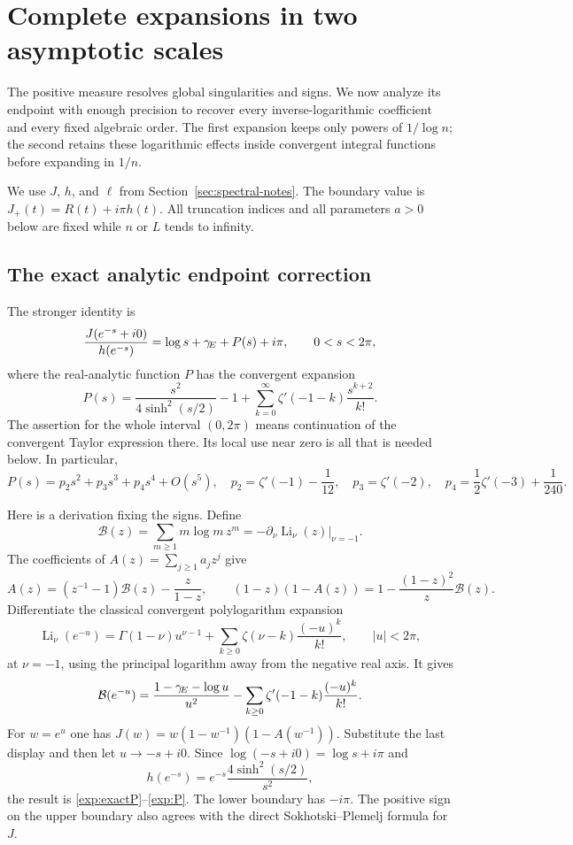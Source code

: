 \section{Complete expansions in two asymptotic scales}
\label{sec:expansions}

The positive measure resolves global singularities and signs. We now analyze
its endpoint with enough precision to recover every inverse-logarithmic
coefficient and every fixed algebraic order. The first expansion keeps only
powers of $1/\log n$; the second retains these logarithmic effects inside
convergent integral functions before expanding in $1/n$.

We use $J$, $h$, and $\ell$ from
Section~\ref{sec:spectral-notes}. The boundary value is
$J_+(t)=R(t)+i\pi h(t)$. All truncation indices and all parameters
$a>0$ below are fixed while $n$ or $L$ tends to infinity.

\subsection{The exact analytic endpoint correction}

The stronger identity is
\begin{equation}\label{exp:exactP}
 \frac{J(e^{-s}+i0)}{h(e^{-s})}
 =\log s+\gamma_{\!E}+P(s)+i\pi,\qquad 0<s<2\pi,
\end{equation}
where the real-analytic function $P$ has the convergent expansion
\begin{equation}\label{exp:P}
 P(s)=\frac{s^2}{4\sinh^2(s/2)}-1
       +\sum_{k=0}^{\infty}\zeta'(-1-k)\frac{s^{k+2}}{k!}.
\end{equation}
The assertion for the whole interval $(0,2\pi)$ means continuation of the
convergent Taylor expression there. Its local use near zero is all that is
needed below. In particular,
\[
 P(s)=p_2s^2+p_3s^3+p_4s^4+O(s^5),
 \quad
 p_2=\zeta'(-1)-\frac1{12},\quad
 p_3=\zeta'(-2),\quad
 p_4=\frac12\zeta'(-3)+\frac1{240}.
\]

Here is a derivation fixing the signs. Define
\[
 \mathcal B(z)=\sum_{m\geq1}m\log m\,z^m
             =-\left.\partial_\nu\operatorname{Li}_\nu(z)\right|_{\nu=-1}.
\]
The coefficients of $A(z)=\sum_{j\geq1}a_jz^j$ give
\[
 A(z)=(z^{-1}-1)\mathcal B(z)-\frac z{1-z},
 \qquad
 (1-z)(1-A(z))=1-\frac{(1-z)^2}{z}\mathcal B(z).
\]
Differentiate the classical convergent polylogarithm expansion \cite[25.12.12]{DLMF}
\[
 \operatorname{Li}_\nu(e^{-u})
 =\Gamma(1-\nu)u^{\nu-1}
  +\sum_{k\geq0}\zeta(\nu-k)\frac{(-u)^k}{k!},\qquad |u|<2\pi,
\]
at $\nu=-1$, using the principal logarithm away from the negative real axis.
It gives
\[
 \mathcal B(e^{-u})
 =\frac{1-\gamma_{\!E}-\log u}{u^2}
  -\sum_{k\geq0}\zeta'(-1-k)\frac{(-u)^k}{k!}.
\]
For $w=e^u$ one has
$J(w)=w(1-w^{-1})(1-A(w^{-1}))$.
Substitute the last display and then let $u\to-s+i0$.
Since $\log(-s+i0)=\log s+i\pi$ and
\[
 h(e^{-s})=e^{-s}\frac{4\sinh^2(s/2)}{s^2},
\]
the result is \eqref{exp:exactP}--\eqref{exp:P}.
The lower boundary has $-i\pi$. The positive sign on the upper boundary also
agrees with the direct Sokhotski--Plemelj formula for $J$.

